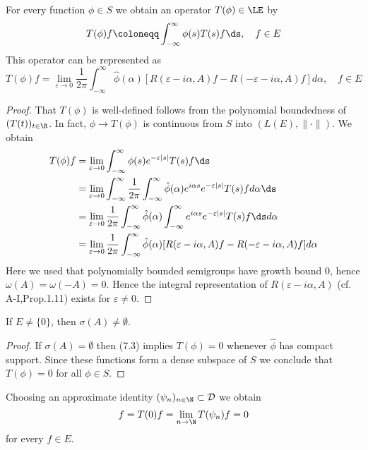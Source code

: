 \begin{lemma}\label{lem:a3-7.5}
For every function $\phi \in S$ we obtain an operator $T(\phi) \in \LE$ by
\[
T(\phi)f \coloneqq \int_{-\infty}^{\infty} \phi(s)T(s)f \ds, \quad f \in E
\]
This operator can be represented as
\begin{equation}\label{eq:a3-7.3}
T(\phi)f = \lim_{\varepsilon\to 0} \frac{1}{2\pi}\int_{-\infty}^{\infty} \hat{\phi}(\alpha)[R(\varepsilon-i\alpha,A)f - R(-\varepsilon-i\alpha,A)f] d\alpha, \quad f \in E
\end{equation}
\end{lemma}
\begin{proof}
That $T(\phi)$ is well-defined follows from the polynomial boundedness of $(T(t))_{t\in\R}$.
In fact, $\phi \to T(\phi)$ is continuous from $S$ into $(L(E),\|\cdot\|)$.
We obtain
\begin{align*}
T(\phi)f &= \lim_{\varepsilon\to 0} \int_{-\infty}^{\infty} \phi(s)e^{-\varepsilon|s|}T(s)f \ds \\
&= \lim_{\varepsilon\to 0} \int_{-\infty}^{\infty} \frac{1}{2\pi}\int_{-\infty}^{\infty} \hat{\phi}(\alpha)e^{i\alpha s}e^{-\varepsilon|s|}T(s)f d\alpha \ds \\
&= \lim_{\varepsilon\to 0} \frac{1}{2\pi}\int_{-\infty}^{\infty} \hat{\phi}(\alpha)\int_{-\infty}^{\infty} e^{i\alpha s}e^{-\varepsilon|s|}T(s)f \ds d\alpha \\
&= \lim_{\varepsilon\to 0} \frac{1}{2\pi}\int_{-\infty}^{\infty} \hat{\phi}(\alpha)[R(\varepsilon-i\alpha,A)f - R(-\varepsilon-i\alpha,A)f] d\alpha
\end{align*}
Here we used that polynomially bounded semigroups have growth bound $0$, hence $\omega(A) = \omega(-A) = 0$.
Hence the integral representation of $R(\varepsilon-i\alpha,A)$ (cf. A-I,Prop.1.11) exists for $\varepsilon \neq 0$.
\end{proof}

\begin{lemma}\label{lem:a3-7.6}
If $E \neq \{0\}$, then $\sigma(A) \neq \emptyset$.
\end{lemma}

\begin{proof}
If $\sigma(A) = \emptyset$ then (7.3) implies $T(\phi) = 0$ whenever $\hat{\phi}$ has compact support.
Since these functions form a dense subspace of $S$ we conclude that $T(\phi) = 0$ for all $\phi \in S$.
\end{proof}


\newpage
Choosing an approximate identity $(\psi_{n})_{n\in\N} \subset \mathcal{D}$ we obtain
\[
f = T(0)f = \lim_{n\to\N} T(\psi_{n})f = 0
\]
for every $f \in E$.

